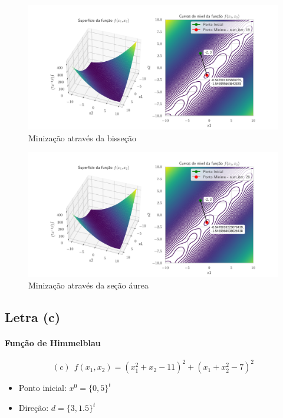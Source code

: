 \documentclass[12pt]{article}
\begin{document}
\begin{figure}[H]
    \centering
    \includegraphics[scale = 0.6]{figures/bisection_2b.pdf}
    \caption{Minização através da bisseção}
\end{figure}

\begin{figure}[H]
    \centering
    \includegraphics[scale = 0.6]{figures/golden_section_2b.pdf}
    \caption{Minização através da seção áurea}
\end{figure}

\subsection{Letra (c)}

\paragraph{Função de Himmelblau}

\begin{equation}
(c) ~~ f(x_{1}, x_{2}) = (x_{1}^{2}+x_{2}-11)^{2} + (x_{1}+x_{2}^{2}-7)^{2}
\end{equation}

\begin{itemize}
    \item Ponto inicial: $x^{0}=\{0,5\}^{t}$
    \item Direção: $d=\{3,1.5\}^{t}$
\end{itemize}
\end{document}
